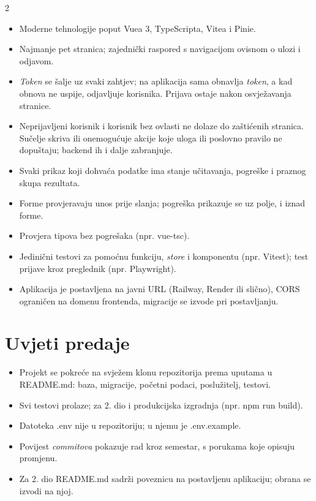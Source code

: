 \documentclass[10pt,a4paper]{article}
\newcommand{\code}[1]{{\ttfamily #1}}
\begin{document}
\begin{multicols}{2}
\begin{itemize}
  \item Moderne tehnologije poput Vuea 3, TypeScripta, Vitea i Pinie.
  \item Najmanje pet stranica; zajednički raspored s navigacijom ovisnom o ulozi i odjavom.
  \item \emph{Token} se šalje uz svaki zahtjev; na \code{401} aplikacija sama obnavlja \emph{token}, a kad obnova ne uspije, odjavljuje korisnika. Prijava ostaje nakon osvježavanja stranice.
  \item Neprijavljeni korisnik i korisnik bez ovlasti ne dolaze do zaštićenih stranica. Sučelje skriva ili onemogućuje akcije koje uloga ili poslovno pravilo ne dopuštaju; backend ih i dalje zabranjuje.
  \item Svaki prikaz koji dohvaća podatke ima stanje učitavanja, pogreške i praznog skupa rezultata.
  \item Forme provjeravaju unos prije slanja; pogreška \code{422} prikazuje se uz polje, \code{400} i \code{409} iznad forme.
  \item Provjera tipova bez pogrešaka (npr. \code{vue-tsc}).
  \item Jedinični testovi za pomoćnu funkciju, \emph{store} i komponentu (npr. Vitest); test prijave kroz preglednik (npr. Playwright).
  \item Aplikacija je postavljena na javni URL (Railway, Render ili slično), CORS ograničen na domenu frontenda, migracije se izvode pri postavljanju.
\end{itemize}

\section{Uvjeti predaje}

\begin{itemize}
  \item Projekt se pokreće na svježem klonu repozitorija prema uputama u \code{README.md}: baza, migracije, početni podaci, poslužitelj, testovi.
  \item Svi testovi prolaze; za 2. dio i produkcijska izgradnja (npr. \code{npm run build}).
  \item Datoteka \code{.env} nije u repozitoriju; u njemu je \code{.env.example}.
  \item Povijest \emph{commitova} pokazuje rad kroz semestar, s porukama koje opisuju promjenu.
  \item Za 2. dio \code{README.md} sadrži poveznicu na postavljenu aplikaciju; obrana se izvodi na njoj.
\end{itemize}
\end{multicols}
\end{document}
